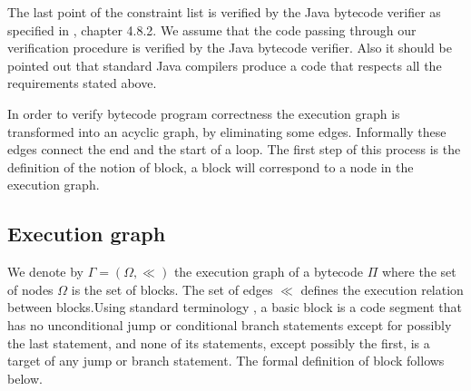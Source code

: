 The last point of the constraint list is verified by the Java bytecode verifier as specified in \cite{VMSpec}, chapter 4.8.2. We assume that the code passing through our verification procedure is verified by the Java bytecode verifier.
Also it should be pointed out that standard Java compilers produce a code that respects all the requirements stated above.

In order to verify  bytecode program correctness the execution graph is transformed into an acyclic graph, by eliminating some edges. Informally these edges connect the end and the start of a loop.
The first step of this process is the definition of the notion of block, a block will correspond to a node in the execution graph.


\subsection{Execution graph}
We denote by $\Gamma  = ( \Omega, \ll)$ the execution graph of a
bytecode $\Pi$ where the set of nodes $\Omega$ is the set of
blocks. The set of edges $\ll$ defines the execution relation
between blocks.Using standard terminology \cite{ARUCom1986}, a
basic block is a code segment that has no unconditional jump or
conditional branch statements except for possibly the last
statement, and none of its statements, except possibly the first,
is a target of any jump or branch statement. The formal definition of block follows
below.
%

